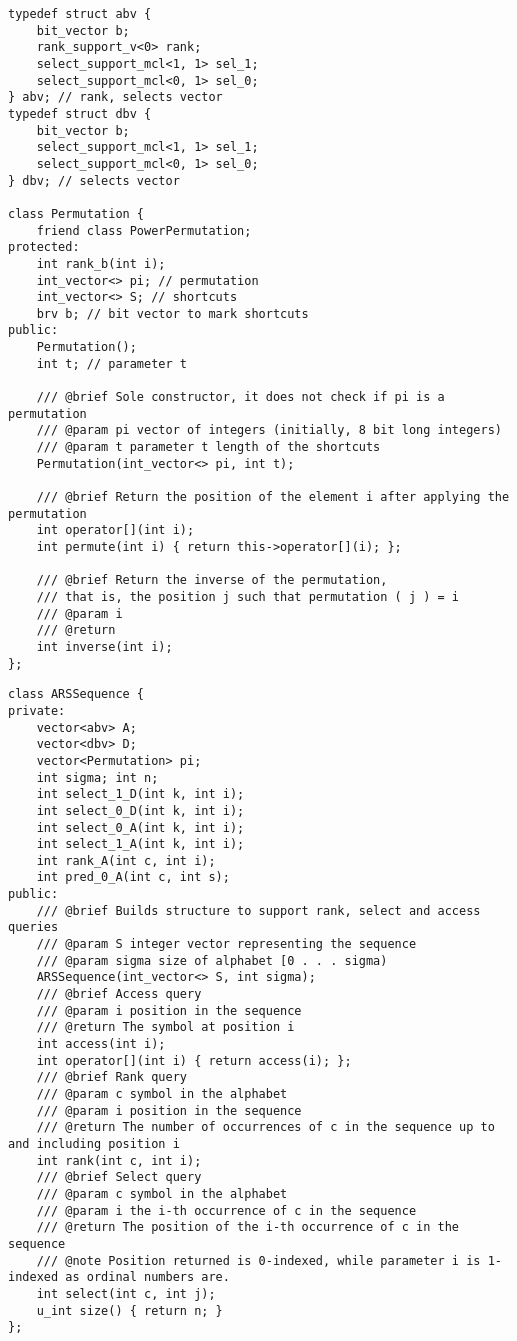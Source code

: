 \begin{lstlisting}[style=cppstyle, caption={Permutaciones utilizando vectores de bit}, label={lst:perm}]
typedef struct abv {
    bit_vector b;
    rank_support_v<0> rank;
    select_support_mcl<1, 1> sel_1;
    select_support_mcl<0, 1> sel_0;
} abv; // rank, selects vector
typedef struct dbv {
    bit_vector b;
    select_support_mcl<1, 1> sel_1;
    select_support_mcl<0, 1> sel_0;
} dbv; // selects vector

class Permutation {
    friend class PowerPermutation;
protected:    
    int rank_b(int i);
    int_vector<> pi; // permutation
    int_vector<> S; // shortcuts
    brv b; // bit vector to mark shortcuts
public:    
    Permutation();
    int t; // parameter t    
    
    /// @brief Sole constructor, it does not check if pi is a permutation
    /// @param pi vector of integers (initially, 8 bit long integers)
    /// @param t parameter t length of the shortcuts
    Permutation(int_vector<> pi, int t);

    /// @brief Return the position of the element i after applying the permutation
    int operator[](int i);
    int permute(int i) { return this->operator[](i); };

    /// @brief Return the inverse of the permutation, 
    /// that is, the position j such that permutation ( j ) = i
    /// @param i 
    /// @return 
    int inverse(int i);
};
\end{lstlisting} 
\begin{lstlisting}[style=cppstyle, caption={Secuencia utilizando permutaciones}, label={lst:seq}]
class ARSSequence {
private:
    vector<abv> A;
    vector<dbv> D;
    vector<Permutation> pi;
    int sigma; int n;
    int select_1_D(int k, int i);
    int select_0_D(int k, int i);
    int select_0_A(int k, int i);
    int select_1_A(int k, int i);
    int rank_A(int c, int i);
    int pred_0_A(int c, int s);
public:
    /// @brief Builds structure to support rank, select and access queries
    /// @param S integer vector representing the sequence
    /// @param sigma size of alphabet [0 . . . sigma)
    ARSSequence(int_vector<> S, int sigma);
    /// @brief Access query
    /// @param i position in the sequence
    /// @return The symbol at position i
    int access(int i);
    int operator[](int i) { return access(i); };
    /// @brief Rank query
    /// @param c symbol in the alphabet
    /// @param i position in the sequence
    /// @return The number of occurrences of c in the sequence up to and including position i    
    int rank(int c, int i);
    /// @brief Select query
    /// @param c symbol in the alphabet 
    /// @param i the i-th occurrence of c in the sequence
    /// @return The position of the i-th occurrence of c in the sequence
    /// @note Position returned is 0-indexed, while parameter i is 1-indexed as ordinal numbers are.
    int select(int c, int j);
    u_int size() { return n; }
};
\end{lstlisting} 
